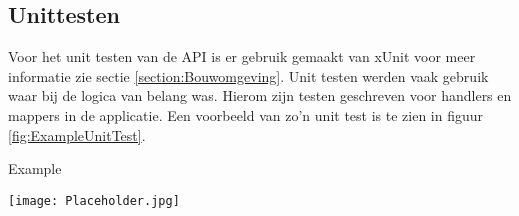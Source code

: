 \subsection{Unittesten}
Voor het unit testen van de API is er gebruik gemaakt van xUnit voor meer informatie zie sectie \ref{section:Bouwomgeving}.
Unit testen werden vaak gebruik waar bij de logica van belang was.
Hierom zijn testen geschreven voor handlers en mappers in de applicatie.
Een voorbeeld van zo'n unit test is te zien in figuur \ref{fig:ExampleUnitTest}.

\whitespace[2]
\begin{graphic}
	\captionsetup{type=figure}
	\caption{Example}
	\texttt{[image: Placeholder.jpg]}
	\label{fig:ExampleUnitTest}
\end{graphic}

